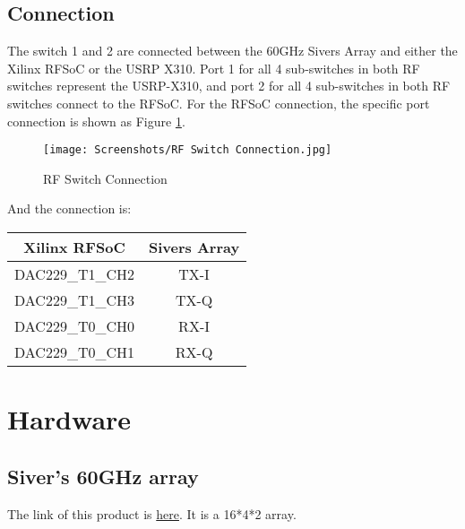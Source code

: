 \documentclass{article}
\begin{document}
        
    \subsection{Connection} \label{sec: switch connection}
        The switch 1 and 2 are connected between the 60GHz Sivers Array and either the Xilinx RFSoC or the USRP X310. Port 1 for all 4 sub-switches in both RF switches represent the USRP-X310, and port 2 for all 4 sub-switches in both RF switches connect to the RFSoC. For the RFSoC connection, the specific port connection is shown as Figure \ref{fig: RF Switch Connection}. 
        \begin{figure}[ht]
            \centering
            \texttt{[image: Screenshots/RF Switch Connection.jpg]}
            \caption{RF Switch Connection}
            \vspace*{0mm}
            \label{fig: RF Switch Connection}
        \end{figure}
    
    And the connection is:
    
    \begin{center}
    \begin{tabular}{|c|c|}
        \hline
        \textbf{Xilinx RFSoC} & \textbf{Sivers Array}  \\
        \hline\hline
        DAC229\_T1\_CH2 & TX-I \\
        \hline
        DAC229\_T1\_CH3 & TX-Q \\
        \hline
        DAC229\_T0\_CH0 & RX-I \\
        \hline
        DAC229\_T0\_CH1 & RX-Q \\ [1ex]
        \hline
    \end{tabular}
    \end{center}
        
    
\section{Hardware}
    \subsection{Siver's 60GHz array}
    The link of this product is \href{https://www.sivers-semiconductors.com/evaluation-kits__trashed/evaluation-kit-evk06002/}{here}. It is a 16*4*2 array.
    
    
    
\end{document}
